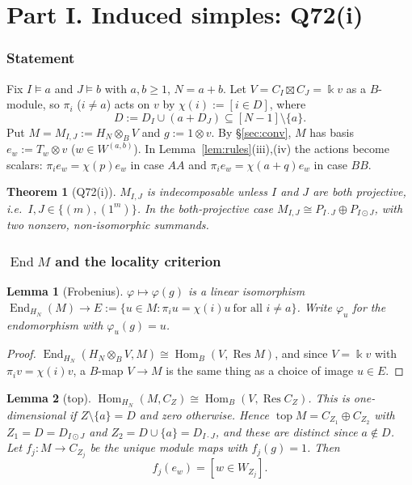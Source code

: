 \documentclass[11pt]{amsart}
\newcommand{\Hom}{\operatorname{Hom}}
\newcommand{\End}{\operatorname{End}}
\newcommand{\Res}{\operatorname{Res}}
\newcommand{\topp}{\operatorname{top}}
\newcommand{\kk}{\Bbbk}
\newcommand{\sq}{\boxtimes}
\theoremstyle{plain}
\newtheorem{theorem}{Theorem}
\newtheorem{lemma}{Lemma}[section]
\theoremstyle{definition}
\begin{document}
\part*{Part I. Induced simples: Q72(i)}

\section{Statement}

Fix $I\vDash a$ and $J\vDash b$ with $a,b\ge1$, $N=a+b$. Let $V=C_I\sq C_J=\kk v$ as a $B$-module, so $\pi_i$ ($i\ne a$) acts on $v$ by $\chi(i):=[i\in D]$, where
\[
D:=D_I\cup(a+D_J)\subseteq[N-1]\setminus\{a\}.
\]
Put $M=M_{I,J}:=H_N\otimes_BV$ and $g:=1\otimes v$. By \S\ref{sec:conv}, $M$ has basis $e_w:=T_w\otimes v$ ($w\in W^{(a,b)}$). In Lemma~\ref{lem:rules}(iii),(iv) the actions become scalars: $\pi_ie_w=\chi(p)e_w$ in case $AA$ and $\pi_ie_w=\chi(a+q)e_w$ in case $BB$.

\begin{theorem}[Q72(i)]\label{thm:A}
$M_{I,J}$ is indecomposable unless $I$ and $J$ are both projective, i.e.\ $I,J\in\{(m),(1^m)\}$. In the both-projective case $M_{I,J}\cong P_{I\cdot J}\oplus P_{I\odot J}$, with two nonzero, non-isomorphic summands.
\end{theorem}

\section{\texorpdfstring{$\End M$}{End M} and the locality criterion}

\begin{lemma}[Frobenius]\label{lem:I-frob}
$\varphi\mapsto\varphi(g)$ is a linear isomorphism $\End_{H_N}(M)\to E:=\{u\in M:\pi_iu=\chi(i)u\ \text{for all } i\ne a\}$. Write $\varphi_u$ for the endomorphism with $\varphi_u(g)=u$.
\end{lemma}

\begin{proof}
$\End_{H_N}(H_N\otimes_BV,M)\cong\Hom_B(V,\Res M)$, and since $V=\kk v$ with $\pi_i v=\chi(i)v$, a $B$-map $V\to M$ is the same thing as a choice of image $u\in E$.
\end{proof}

\begin{lemma}[top]\label{lem:I-top}
$\Hom_{H_N}(M,C_Z)\cong\Hom_B(V,\Res C_Z)$. This is one-dimensional if $Z\setminus\{a\}=D$ and zero otherwise. Hence $\topp M=C_{Z_1}\oplus C_{Z_2}$ with $Z_1=D=D_{I\odot J}$ and $Z_2=D\cup\{a\}=D_{I\cdot J}$, and these are distinct since $a\notin D$. Let $f_j:M\to C_{Z_j}$ be the unique module maps with $f_j(g)=1$. Then
\[
f_j(e_w)=[w\in W_{Z_j}].
\]
\end{lemma}
\end{document}
